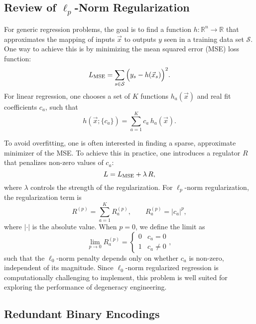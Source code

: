 \documentclass[aps,prd,twocolumn, superscriptaddress,preprintnumbers, nofootinbib,longbibliography,floatfix]{revtex4-2}
\begin{document}
\subsection{Review of $\ell_p$-Norm Regularization}\label{sec:lp_reg}

For generic regression problems, the goal is to find a function $h:\mathbb{R}^n\to\mathbb{R}$ that approximates the mapping of inputs $\vec{x}$ to outputs $y$ seen in a training data set $\mathcal{S}$.
%
One way to achieve this is by minimizing the mean squared error (MSE) loss function:
%
\begin{equation}
\label{eq:MSE}
L_{\rm MSE} = \sum_{s \in \mathcal{S}} \Big(y_s - h(\vec{x}_s) \Big)^2 .
\end{equation}
%
For linear regression, one chooses a set of $K$ functions $h_a(\vec{x})$ and real fit coefficients $c_a$, such that
%
\begin{equation}
h(\vec{x}; \{c_a\}) = \sum_{a = 1}^{K} c_a \, h_a(\vec{x}).
\label{eq:functions}
\end{equation}


To avoid overfitting, one is often interested in finding a sparse, approximate minimizer of the MSE.
%
To achieve this in practice, one introduces a regulator $R$ that penalizes non-zero values of $c_a$:
%
\begin{equation}
\label{eq:regularized}
L = L_{\rm MSE} + \lambda \, R,
\end{equation}
%
where $\lambda$ controls the strength of the regularization.
%
For $\ell_p$-norm regularization, the regularization term is
%
\begin{equation}
\label{eq:regularized_form}
R^{(p)} =  \sum_{a = 1}^K R_a^{(p)}, \qquad R_a^{(p)} = |c_a|^p,
\end{equation}
%
where $|\cdot|$ is the absolute value.
%
When $p = 0$, we define the limit as
%
\begin{equation}
\lim_{p \to 0} R_a^{(p)}  =
	\begin{cases}   
		0 & c_a = 0 \\
		1 & c_a \not= 0
	\end{cases},
\end{equation}
%
such that the $\ell_0$-norm penalty depends only on whether $c_a$ is non-zero, independent of its magnitude.
%
Since $\ell_0$-norm regularized regression is computationally challenging to implement, this problem is well suited for exploring the performance of degeneracy engineering.


\subsection{Redundant Binary Encodings}
\end{document}
